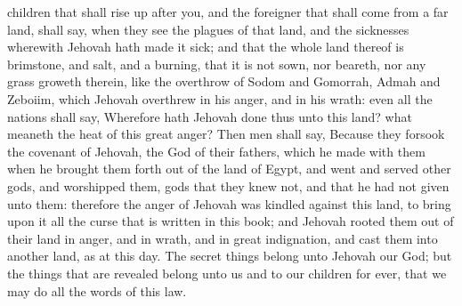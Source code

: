children that shall rise up after you, and the foreigner that shall come from a far land, shall say, when they see the plagues of that land, and the sicknesses wherewith Jehovah hath made it sick; and that the whole land thereof is brimstone, and salt, and a burning, that it is not sown, nor beareth, nor any grass groweth therein, like the overthrow of Sodom and Gomorrah, Admah and Zeboiim, which Jehovah overthrew in his anger, and in his wrath: even all the nations shall say, Wherefore hath Jehovah done thus unto this land? what meaneth the heat of this great anger? Then men shall say, Because they forsook the covenant of Jehovah, the God of their fathers, which he made with them when he brought them forth out of the land of Egypt, and went and served other gods, and worshipped them, gods that they knew not, and that he had not given unto them: therefore the anger of Jehovah was kindled against this land, to bring upon it all the curse that is written in this book; and Jehovah rooted them out of their land in anger, and in wrath, and in great indignation, and cast them into another land, as at this day. The secret things belong unto Jehovah our God; but the things that are revealed belong unto us and to our children for ever, that we may do all the words of this law. 

